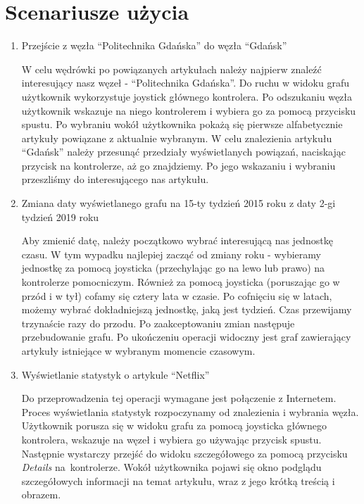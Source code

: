 \section{Scenariusze użycia}
\label{sec:scenariusze}
\begin{enumerate}
\item Przejście z węzła ``Politechnika Gdańska'' do węzła ``Gdańsk''

	W celu wędrówki po powiązanych artykułach należy najpierw znaleźć interesujący nasz węzeł - ``Politechnika Gdańska''. Do ruchu w widoku grafu użytkownik wykorzystuje joystick głównego kontrolera. Po odszukaniu węzła użytkownik wskazuje na niego kontrolerem i wybiera go za pomocą przycisku spustu. Po wybraniu wokół użytkownika pokażą się pierwsze alfabetycznie artykuły powiązane z aktualnie wybranym. W celu znalezienia artykułu ``Gdańsk'' należy przesunąć przedziały wyświetlanych powiązań, naciskając przycisk na kontrolerze, aż go znajdziemy. Po jego wskazaniu i wybraniu przeszliśmy do interesującego nas artykułu.
	
\item Zmiana daty wyświetlanego grafu na 15-ty tydzień  2015 roku z daty 2-gi tydzień 2019 roku

    Aby zmienić datę, należy początkowo wybrać interesującą nas jednostkę czasu. W tym wypadku najlepiej zacząć od zmiany roku - wybieramy jednostkę za pomocą joysticka (przechylając go na lewo lub prawo) na kontrolerze pomocniczym. Również za pomocą joysticka (poruszając go w przód i w tył) cofamy się cztery lata w czasie. Po cofnięciu się w latach, możemy wybrać dokładniejszą jednostkę, jaką jest tydzień. Czas przewijamy trzynaście razy do przodu. Po zaakceptowaniu zmian następuje przebudowanie grafu. Po ukończeniu operacji widoczny jest graf zawierający artykuły istniejące w wybranym momencie czasowym.
	
\item Wyświetlanie statystyk o artykule ``Netflix''

	Do przeprowadzenia tej operacji wymagane jest połączenie z Internetem. Proces wyświetlania statystyk rozpoczynamy od znalezienia i wybrania węzła. Użytkownik porusza się w widoku grafu za pomocą joysticka głównego kontrolera, wskazuje na węzeł i wybiera go używając przycisk spustu. Następnie wystarczy przejść do widoku szczegółowego za pomocą przycisku \textit{Details} na~kontrolerze. Wokół użytkownika pojawi się okno podglądu szczegółowych informacji na temat artykułu, wraz z jego krótką treścią i obrazem.
	

\end{enumerate}
